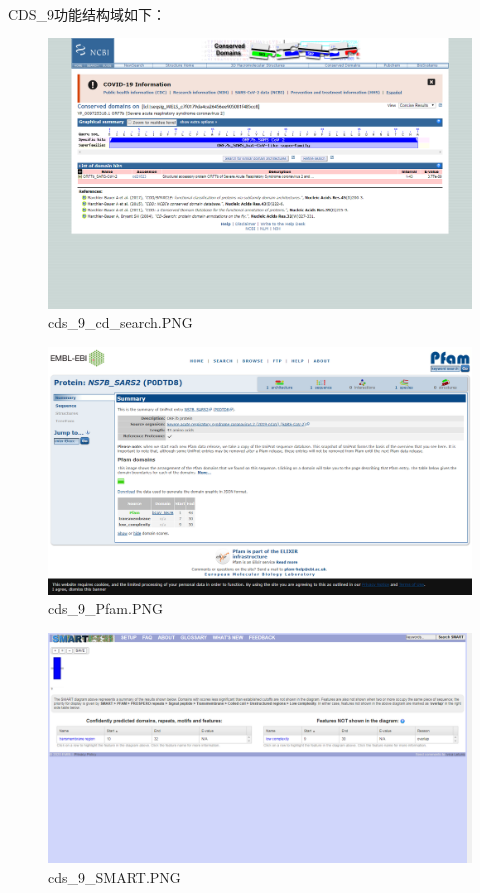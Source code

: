 \documentclass[supercite]{HustGraduPaper}
\begin{document}
	\paragraph{}\label{subpara:subpara}CDS\_9功能结构域如下：
	\begin{figure}[H]
		\centering
		\includegraphics[width=1\textwidth]{./material/practice2/cds_9/cd_search.png}
		\caption{cds\_9\_cd\_search.PNG}
	\end{figure}
	\begin{figure}[H]
		\centering
		\includegraphics[width=1\textwidth]{./material/practice2/cds_9/Pfam.png}
		\caption{cds\_9\_Pfam.PNG}
	\end{figure}
	\begin{figure}[H]
		\centering
		\includegraphics[width=1\textwidth]{./material/practice2/cds_9/SMART.png}
		\caption{cds\_9\_SMART.PNG}
	\end{figure}
\end{document}
